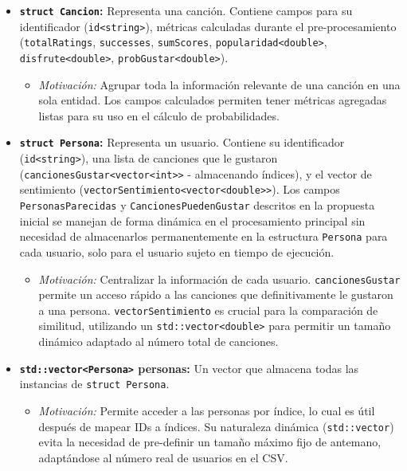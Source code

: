 \documentclass{article}
\begin{document}
\begin{itemize}[label=\textbullet]
    \item \textbf{\texttt{struct Cancion}:} Representa una canción. Contiene campos para su identificador (\texttt{id<string>}), métricas calculadas durante el pre-procesamiento (\texttt{totalRatings}, \texttt{successes}, \texttt{sumScores}, \texttt{popularidad<double>}, \texttt{disfrute<double>}, \texttt{probGustar<double>}).
    \begin{itemize}[label=\textendash]
        \item \textit{Motivación:} Agrupar toda la información relevante de una canción en una sola entidad. Los campos calculados permiten tener métricas agregadas listas para su uso en el cálculo de probabilidades.
    \end{itemize}
    \item \textbf{\texttt{struct Persona}:} Representa un usuario. Contiene su identificador (\texttt{id<string>}), una lista de canciones que le gustaron (\texttt{cancionesGustar<vector<int>>} - almacenando índices), y el vector de sentimiento (\texttt{vectorSentimiento<vector<double>>}). Los campos \texttt{PersonasParecidas} y \texttt{CancionesPuedenGustar} descritos en la propuesta inicial se manejan de forma dinámica en el procesamiento principal sin necesidad de almacenarlos permanentemente en la estructura \texttt{Persona} para cada usuario, solo para el usuario sujeto en tiempo de ejecución.
     \begin{itemize}[label=\textendash]
        \item \textit{Motivación:} Centralizar la información de cada usuario. \texttt{cancionesGustar} permite un acceso rápido a las canciones que definitivamente le gustaron a una persona. \texttt{vectorSentimiento} es crucial para la comparación de similitud, utilizando un \texttt{std::vector<double>} para permitir un tamaño dinámico adaptado al número total de canciones.
    \end{itemize}
    \item \textbf{\texttt{std::vector<Persona>} personas:} Un vector que almacena todas las instancias de \texttt{struct Persona}.
    \begin{itemize}[label=\textendash]
        \item \textit{Motivación:} Permite acceder a las personas por índice, lo cual es útil después de mapear IDs a índices. Su naturaleza dinámica (\texttt{std::vector}) evita la necesidad de pre-definir un tamaño máximo fijo de antemano, adaptándose al número real de usuarios en el CSV.

\end{itemize}
\end{itemize}
\end{document}
